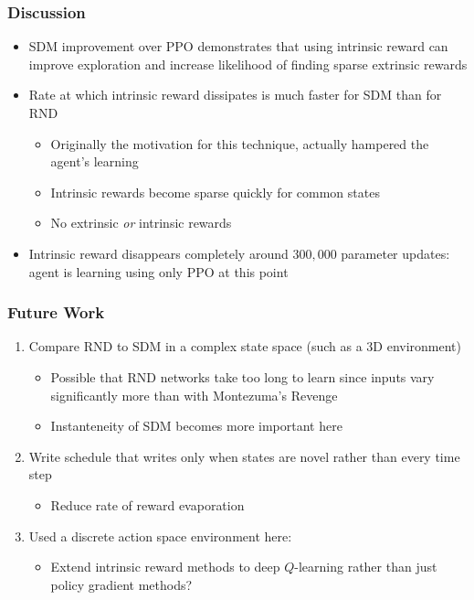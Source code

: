 \documentclass{beamer}
\begin{document}
\begin{frame}
  \frametitle{Discussion}
  \begin{itemize}
    \item SDM improvement over PPO demonstrates that using intrinsic reward can improve exploration and increase likelihood of finding sparse extrinsic rewards
    \item Rate at which intrinsic reward dissipates is much faster for SDM than for RND
    \begin{itemize}
      \item Originally the motivation for this technique, actually hampered the agent's learning
      \item Intrinsic rewards become sparse quickly for common states
      \item No extrinsic \textit{or} intrinsic rewards
    \end{itemize}
    \item Intrinsic reward disappears completely around $300,000$ parameter updates: agent is learning using only PPO at this point
  \end{itemize}
\end{frame}

\begin{frame}
  \frametitle{Future Work}
  \begin{enumerate}
    \item Compare RND to SDM in a complex state space (such as a 3D environment)
    \begin{itemize}
      \item Possible that RND networks take too long to learn since inputs vary significantly more than with Montezuma's Revenge
      \item Instanteneity of SDM becomes more important here
    \end{itemize}
    \item Write schedule that writes only when states are novel rather than every time step
    \begin{itemize}
      \item Reduce rate of reward evaporation
    \end{itemize}
    \item Used a discrete action space environment here:
    \begin{itemize}
      \item Extend intrinsic reward methods to deep $Q$-learning rather than just policy gradient methods?
    \end{itemize}
  \end{enumerate}
\end{frame}
\end{document}
